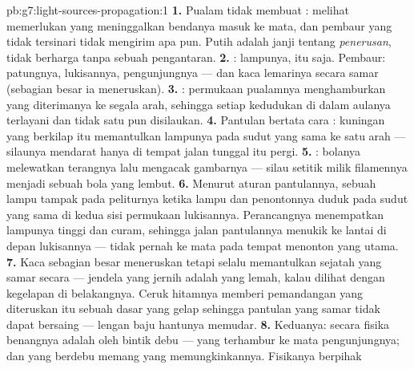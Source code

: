 \begin{solution}{pb:g7:light-sources-propagation:1}
\textbf{1.} Pualam tidak membuat : melihat memerlukan 
yang meninggalkan bendanya masuk ke mata, dan pembaur yang tidak
tersinari tidak mengirim apa pun. Putih adalah janji tentang
\emph{penerusan}, tidak berharga tanpa sebuah pengantaran.
\textbf{2.} : lampunya, itu saja. Pembaur: patungnya,
lukisannya, pengunjungnya --- dan kaca lemarinya secara samar
(sebagian besar ia meneruskan).
\textbf{3.} : permukaan pualamnya menghamburkan  yang
diterimanya ke segala arah, sehingga setiap kedudukan di dalam aulanya
terlayani dan tidak satu pun disilaukan.
\textbf{4.} Pantulan bertata cara : kuningan yang berkilap itu
memantulkan  lampunya pada sudut yang sama ke satu arah ---
silaunya mendarat hanya di tempat jalan tunggal itu pergi.
\textbf{5.} : bolanya melewatkan terangnya lalu mengacak gambarnya
--- silau setitik milik filamennya menjadi sebuah bola  yang
lembut.
\textbf{6.} Menurut aturan pantulannya, sebuah lampu tampak pada
peliturnya ketika lampu dan penontonnya duduk pada sudut yang sama di
kedua sisi permukaan lukisannya. Perancangnya menempatkan lampunya
tinggi dan curam, sehingga jalan pantulannya menukik ke lantai di
depan lukisannya --- tidak pernah ke mata pada tempat menonton yang
utama.
\textbf{7.} Kaca sebagian besar meneruskan tetapi selalu memantulkan
sejatah yang samar secara  --- jendela yang jernih adalah 
yang lemah, kalau dilihat dengan kegelapan di belakangnya. Ceruk
hitamnya memberi pemandangan yang diteruskan itu sebuah dasar yang
gelap sehingga pantulan yang samar tidak dapat bersaing --- lengan baju
hantunya memudar.
\textbf{8.} Keduanya: secara fisika benangnya adalah  oleh
bintik debu ---   yang terhambur ke mata pengunjungnya;
dan  yang berdebu memang yang memungkinkannya. Fisikanya berpihak

\end{solution}
